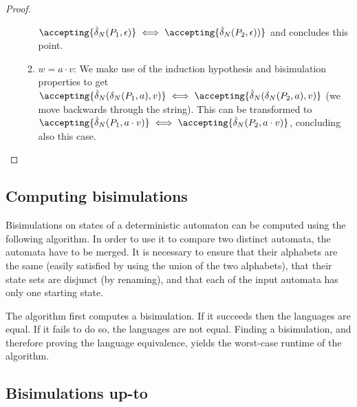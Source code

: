 \begin{proof}
\begin{enumerate}
\begin{enumerate}
            $\accepting{\hat{\delta}_N(P_1, \epsilon)}
              \iff \accepting{\hat{\delta}_N(P_2, \epsilon))}$
            and concludes this point.
        \item $w = a \cdot v$:
          We make use of the induction hypothesis and bisimulation properties
          to get
            $\accepting{\hat{\delta}_N(\delta_N(P_1, a), v)}
              \iff \accepting{\hat{\delta}_N(\delta_N(P_2, a), v)}$
              (we move backwards through the string).
          This can be transformed to
            $\accepting{\hat{\delta}_N(P_1, a \cdot v)}
              \iff \accepting{\hat{\delta}_N(P_2, a \cdot v)}$,
            concluding also this case.
      \end{enumerate}
\end{enumerate}
\end{proof}

\subsection{Computing bisimulations}

Bisimulations on states of a deterministic automaton can be computed using the
  following algorithm.
In order to use it to compare two distinct automata, the automata have to be merged.
It is necessary to ensure that their alphabets are the same (easily satisfied by
  using the union of the two alphabets), that their state sets are disjunct
  (by renaming), and that each of the input automata has only one starting state.



The algorithm first computes a bisimulation.
If it succeeds then the languages are equal.
If it fails to do so, the languages are not equal.
Finding a bisimulation, and therefore proving the language equivalence, yields
  the worst-case runtime of the algorithm.

%
%

\subsection{Bisimulations up-to}

